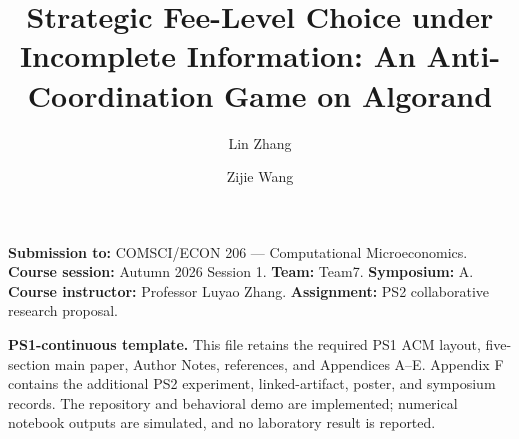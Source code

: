 \documentclass[sigconf,nonacm]{acmart}
\title{Strategic Fee-Level Choice under Incomplete Information: An Anti-Coordination Game on Algorand}
\author{Lin Zhang}
\affiliation{\institution{Duke Kunshan University}\city{Kunshan}\country{China}}
\author{Zijie Wang}
\affiliation{\institution{Duke Kunshan University}\city{Kunshan}\country{China}}
\newcommand{\CourseNumber}{COMSCI/ECON 206}
\newcommand{\CourseName}{Computational Microeconomics}
\newcommand{\CourseSession}{Autumn 2026 Session 1}
\newcommand{\Instructor}{Professor Luyao Zhang}
\newcommand{\TeamCode}{Team7}
\newcommand{\SymposiumSession}{A}
\newcommand{\coursemeta}{\noindent\textbf{Submission to:} \CourseNumber{} --- \CourseName.\\
\textbf{Course session:} \CourseSession. \textbf{Team:} \TeamCode. \textbf{Symposium:} \SymposiumSession.\\
\textbf{Course instructor:} \Instructor. \textbf{Assignment:} PS2 collaborative research proposal.\par\smallskip}
\begin{document}
\begin{teaserfigure}
\captionsetup{skip=8pt}
\centering

\caption{Research design for a one-shot Bayesian anti-coordination game. Two privately informed users simultaneously choose High or Low fees; the matrix identifies congestion and differentiated outcomes, and three treatments test how information and coordination signals affect behavior and welfare. All arrows from treatments to outcomes represent planned tests, not reported results.}
\label{fig:teaser}
\end{teaserfigure}
\maketitle\raggedbottom\coursemeta

\noindent\textcolor{CourseTeal}{\textbf{PS1-continuous template.}} This file retains the required PS1 ACM layout, five-section main paper, Author Notes, references, and Appendices A--E. Appendix F contains the additional PS2 experiment, linked-artifact, poster, and symposium records. The repository and behavioral demo are implemented; numerical notebook outputs are simulated, and no laboratory result is reported.



\end{document}
